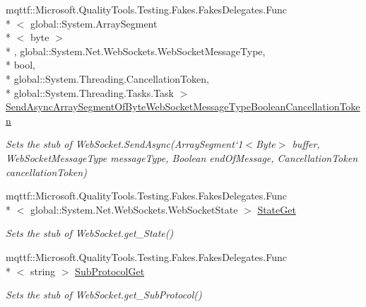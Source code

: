 \begin{DoxyCompactItemize}
mqttf\-::\-Microsoft.\-Quality\-Tools.\-Testing.\-Fakes.\-Fakes\-Delegates.\-Func\\*
$<$ global\-::\-System.\-Array\-Segment\\*
$<$ byte $>$\\*
, global\-::\-System.\-Net.\-Web\-Sockets.\-Web\-Socket\-Message\-Type, \\*
bool, \\*
global\-::\-System.\-Threading.\-Cancellation\-Token, \\*
global\-::\-System.\-Threading.\-Tasks.\-Task $>$ \hyperlink{class_system_1_1_net_1_1_web_sockets_1_1_fakes_1_1_stub_web_socket_a43296b380df149ebce54e12caefe5245}{Send\-Async\-Array\-Segment\-Of\-Byte\-Web\-Socket\-Message\-Type\-Boolean\-Cancellation\-Token}
\begin{DoxyCompactList}\small\item\em Sets the stub of Web\-Socket.\-Send\-Async(Array\-Segment`1$<$Byte$>$ buffer, Web\-Socket\-Message\-Type message\-Type, Boolean end\-Of\-Message, Cancellation\-Token cancellation\-Token)\end{DoxyCompactList}\item 
mqttf\-::\-Microsoft.\-Quality\-Tools.\-Testing.\-Fakes.\-Fakes\-Delegates.\-Func\\*
$<$ global\-::\-System.\-Net.\-Web\-Sockets.\-Web\-Socket\-State $>$ \hyperlink{class_system_1_1_net_1_1_web_sockets_1_1_fakes_1_1_stub_web_socket_a3f61d0ef55d1e5d3d8d92b9e4b73eed4}{State\-Get}
\begin{DoxyCompactList}\small\item\em Sets the stub of Web\-Socket.\-get\-\_\-\-State()\end{DoxyCompactList}\item 
mqttf\-::\-Microsoft.\-Quality\-Tools.\-Testing.\-Fakes.\-Fakes\-Delegates.\-Func\\*
$<$ string $>$ \hyperlink{class_system_1_1_net_1_1_web_sockets_1_1_fakes_1_1_stub_web_socket_a3b7e3fb3b4a92e6154262484df5d8eae}{Sub\-Protocol\-Get}
\begin{DoxyCompactList}\small\item\em Sets the stub of Web\-Socket.\-get\-\_\-\-Sub\-Protocol()\end{DoxyCompactList}\end{DoxyCompactItemize}
